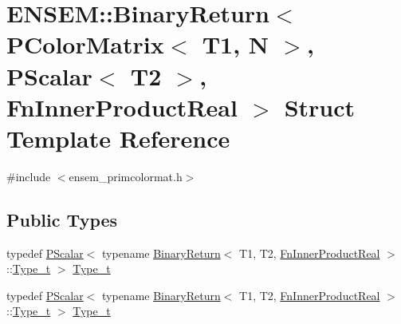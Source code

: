 \hypertarget{structENSEM_1_1BinaryReturn_3_01PColorMatrix_3_01T1_00_01N_01_4_00_01PScalar_3_01T2_01_4_00_01FnInnerProductReal_01_4}{}\section{E\+N\+S\+EM\+:\+:Binary\+Return$<$ P\+Color\+Matrix$<$ T1, N $>$, P\+Scalar$<$ T2 $>$, Fn\+Inner\+Product\+Real $>$ Struct Template Reference}
\label{structENSEM_1_1BinaryReturn_3_01PColorMatrix_3_01T1_00_01N_01_4_00_01PScalar_3_01T2_01_4_00_01FnInnerProductReal_01_4}


{\ttfamily \#include $<$ensem\+\_\+primcolormat.\+h$>$}

\subsection*{Public Types}
\begin{DoxyCompactItemize}
\item 
typedef \mbox{\hyperlink{classENSEM_1_1PScalar}{P\+Scalar}}$<$ typename \mbox{\hyperlink{structENSEM_1_1BinaryReturn}{Binary\+Return}}$<$ T1, T2, \mbox{\hyperlink{structENSEM_1_1FnInnerProductReal}{Fn\+Inner\+Product\+Real}} $>$\+::\mbox{\hyperlink{structENSEM_1_1BinaryReturn_3_01PColorMatrix_3_01T1_00_01N_01_4_00_01PScalar_3_01T2_01_4_00_01FnInnerProductReal_01_4_a89996945f4c4257d5ba835eb45c1b5d6}{Type\+\_\+t}} $>$ \mbox{\hyperlink{structENSEM_1_1BinaryReturn_3_01PColorMatrix_3_01T1_00_01N_01_4_00_01PScalar_3_01T2_01_4_00_01FnInnerProductReal_01_4_a89996945f4c4257d5ba835eb45c1b5d6}{Type\+\_\+t}}
\item 
typedef \mbox{\hyperlink{classENSEM_1_1PScalar}{P\+Scalar}}$<$ typename \mbox{\hyperlink{structENSEM_1_1BinaryReturn}{Binary\+Return}}$<$ T1, T2, \mbox{\hyperlink{structENSEM_1_1FnInnerProductReal}{Fn\+Inner\+Product\+Real}} $>$\+::\mbox{\hyperlink{structENSEM_1_1BinaryReturn_3_01PColorMatrix_3_01T1_00_01N_01_4_00_01PScalar_3_01T2_01_4_00_01FnInnerProductReal_01_4_a89996945f4c4257d5ba835eb45c1b5d6}{Type\+\_\+t}} $>$ \mbox{\hyperlink{structENSEM_1_1BinaryReturn_3_01PColorMatrix_3_01T1_00_01N_01_4_00_01PScalar_3_01T2_01_4_00_01FnInnerProductReal_01_4_a89996945f4c4257d5ba835eb45c1b5d6}{Type\+\_\+t}}
\end{DoxyCompactItemize}


